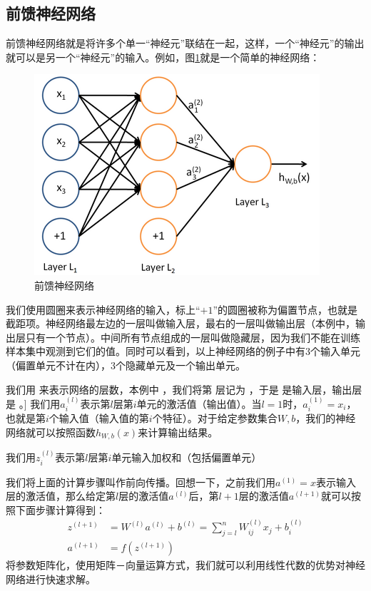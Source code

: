 \subsection{前馈神经网络}
前馈神经网络就是将许多个单一“神经元”联结在一起，这样，一个“神经元”的输出就可以是另一个“神经元”的输入。例如，图\ref{fig_2_3}就是一个简单的神经网络：
\begin{figure}
	\centering
	\includegraphics[scale=0.5]{figures/chapter_2/Network.png}
	\caption{前馈神经网络}\label{fig_2_3}
\end{figure}
我们使用圆圈来表示神经网络的输入，标上“$+1$”的圆圈被称为偏置节点，也就是截距项。神经网络最左边的一层叫做输入层，最右的一层叫做输出层（本例中，输出层只有一个节点）。中间所有节点组成的一层叫做隐藏层，因为我们不能在训练样本集中观测到它们的值。同时可以看到，以上神经网络的例子中有3个输入单元（偏置单元不计在内），3个隐藏单元及一个输出单元。\par

 我们用 来表示网络的层数，本例中 ，我们将第 层记为 ，于是 是输入层，输出层是 。] 我们用$a^{(l)}_i$表示第$l$层第$i$单元的激活值（输出值）。当$l=1$时，$a^{(1)}_i = x_i$，也就是第$i$个输入值（输入值的第$i$个特征）。对于给定参数集合$W,b$，我们的神经网络就可以按照函数$h_{W,b}(x)$来计算输出结果。\par
 
我们用$z^{(l)}_i$表示第$l$层第$i$单元输入加权和（包括偏置单元）

我们将上面的计算步骤叫作前向传播。回想一下，之前我们用$a^{(1)} = x$表示输入层的激活值，那么给定第$l$层的激活值$a^{(l)}$后，第$l+1$层的激活值$a^{(l+1)}$就可以按照下面步骤计算得到：
\begin{align}
	z^{(l+1)} &= W^{(l)} a^{(l)} + b^{(l)}=\sum_{j=l}^n W^{(l)}_{ij} x_j + b^{(l)}_i\\
	a^{(l+1)} &= f(z^{(l+1)})
\end{align}
将参数矩阵化，使用矩阵－向量运算方式，我们就可以利用线性代数的优势对神经网络进行快速求解。\par

